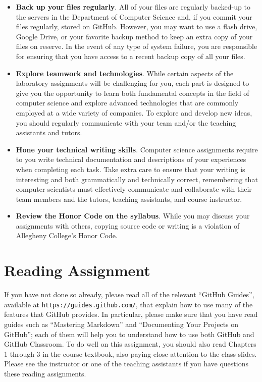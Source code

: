 \documentclass[11pt]{article}
\newcommand{\url}[1]{\lstinline{#1}}
\begin{document}
\begin{itemize}
\item {\bf Back up your files regularly}. All of your files are regularly backed-up to the servers in the Department of
  Computer Science and, if you commit your files regularly, stored on GitHub. However, you may want to use a flash
  drive, Google Drive, or your favorite backup method to keep an extra copy of your files on reserve. In the event of
  any type of system failure, you are responsible for ensuring that you have access to a recent backup copy of all your
  files.

\item {\bf Explore teamwork and technologies}. While certain aspects of the laboratory assignments will be challenging
  for you, each part is designed to give you the opportunity to learn both fundamental concepts in the field of computer
  science and explore advanced technologies that are commonly employed at a wide variety of companies. To explore and
  develop new ideas, you should regularly communicate with your team and/or the teaching assistants and tutors.

\item {\bf Hone your technical writing skills}. Computer science assignments require to you write technical
  documentation and descriptions of your experiences when completing each task. Take extra care to ensure that your
  writing is interesting and both grammatically and technically correct, remembering that computer scientists must
  effectively communicate and collaborate with their team members and the tutors, teaching assistants, and course
  instructor.

\item {\bf Review the Honor Code on the syllabus}. While you may discuss your assignments with others, copying source
  code or writing is a violation of Allegheny College's Honor Code.

\end{itemize}

\section*{Reading Assignment}

If you have not done so already, please read all of the relevant ``GitHub
Guides'', available at \url{https://guides.github.com/}, that explain how to use
many of the features that GitHub provides. In particular, please make sure that
you have read guides such as ``Mastering Markdown'' and ``Documenting Your
Projects on GitHub''; each of them will help you to understand how to use both
GitHub and GitHub Classroom. To do well on this assignment, you should also read
Chapters 1 through 3 in the course textbook, also paying close attention to the
class slides. Please see the instructor or one of the teaching assistants if you
have questions these reading assignments.
\end{document}
